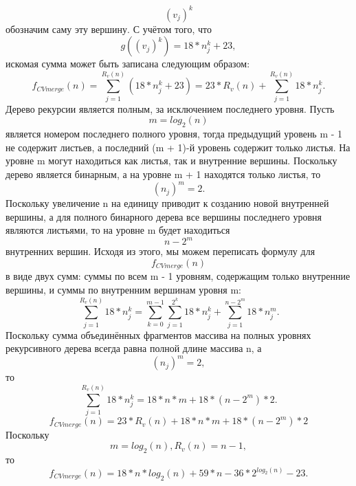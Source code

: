 \documentclass[12pt,a4paper]{scrartcl}
\begin{document}
\begin{equation*}
(v_j)^k
\end{equation*}
обозначим саму эту вершину. С учётом того, что
\begin{equation}\label{eq2.25}
g((v_j)^k) = 18*n_j^k + 23,
\end{equation}
искомая сумма может быть записана следующим образом:
\begin{equation}\label{eq2.26}
f_{CV merge} (n) = \sum \limits_{j=1}^{R_v(n)} (18*n_j^k + 23) = 23*R_v(n) +  \sum \limits_{j=1}^{R_v(n)} 18*n_j^k.
\end{equation}
Дерево рекурсии является полным, за исключением последнего уровня. Пусть
\begin{equation}\label{eq2.27}
m = log_2(n)
\end{equation}
является номером последнего полного уровня, тогда предыдущий уровень m - 1 не содержит листьев, а последний (m + 1)-й уровень содержит только листья. На уровне m могут находиться как листья, так и внутренние вершины. Поскольку дерево является бинарным, а на уровне m + 1 находятся только листья, то 
\begin{equation*}
(n_j)^m = 2.
\end{equation*}
Поскольку увеличение n на единицу приводит к созданию новой внутренней вершины, а для полного бинарного дерева все вершины последнего уровня являются листьями, то на уровне m будет находиться
\begin{equation*}
n - 2^m
\end{equation*}
внутренних вершин. Исходя из этого, мы можем переписать формулу для 
\begin{equation*}
f_{CV merge}(n)
\end{equation*}
в виде двух сумм: суммы по всем m - 1 уровням, содержащим только внутренние вершины, и суммы по внутренним вершинам уровня m:
\begin{equation}\label{eq2.28}
 \sum \limits_{j=1}^{R_v(n)} 18*n_j^k = \sum \limits_{k=0}^{m-1} \sum \limits_{j=1}^{2^k} 18*n_j^k + \sum \limits_{j=1}^{n-2^m} 18*n_j^m.
\end{equation}
Поскольку сумма объединённых фрагментов массива на полных уровнях рекурсивного дерева всегда равна полной длине массива n, а
\begin{equation*}
(n_j)^m = 2,
\end{equation*}
то
\begin{equation}\label{eq2.29}
 \sum \limits_{j=1}^{R_v(n)} 18*n_j^k = 18*n*m + 18*(n - 2^m) *2.
\end{equation}
\begin{equation}\label{eq2.30}
f_{CV merge}(n) = 23*R_v(n) + 18*n*m + 18*(n - 2^m)*2
\end{equation}
Поскольку
\begin{equation*}
m = log_2(n), R_v(n) = n - 1,
\end{equation*}
то
\begin{equation}\label{eq2.31}
f_{CV merge}(n) = 18*n*log_2(n) + 59*n - 36*2^{log_2(n)} - 23.
\end{equation}
\end{document}
